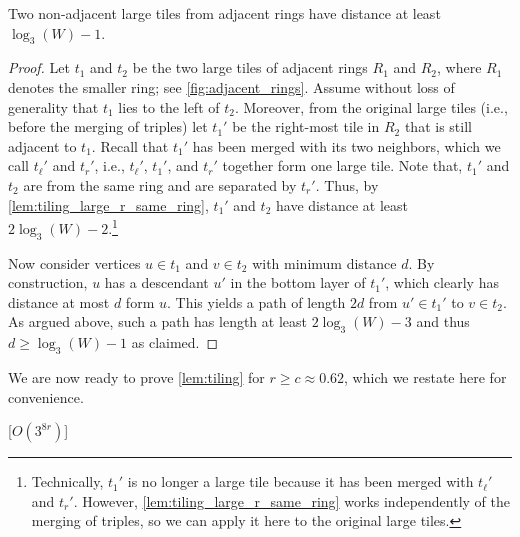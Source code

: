 \documentclass[a4paper,english,cleveref,thm-restate]{lipics-v2021}
\begin{document}
\begin{lemma}
    \label{lem:tiling_large_r_adj_rings}
    Two non-adjacent large tiles from adjacent rings have distance at least $\log_3(W) - 1$.
\end{lemma}
\begin{proof}
    Let $t_1$ and $t_2$ be the two large tiles of adjacent rings $R_1$ and $R_2$, where $R_1$ denotes the smaller ring; see \cref{fig:adjacent_rings}.
    Assume without loss of generality that $t_1$ lies to the left of $t_2$.
    Moreover, from the original large tiles (i.e., before the merging of triples) let $t_1'$ be the right-most tile in $R_2$ that is still adjacent to $t_1$.
    Recall that $t_1'$ has been merged with its two neighbors, which we call $t_\ell'$ and $t_r'$, i.e., $t_\ell'$, $t_1'$, and $t_r'$ together form one large tile.
    Note that, $t_1'$ and $t_2$ are from the same ring and are separated by $t_r'$.
    Thus, by \cref{lem:tiling_large_r_same_ring}, $t_1'$ and $t_2$ have distance at least $2\log_3(W) - 2$.\footnote{Technically, $t_1'$ is no longer a large tile because it has been merged with $t_\ell'$ and $t_r'$.
      However, \cref{lem:tiling_large_r_same_ring} works independently of the merging of triples, so we can apply it here to the original large tiles.}

    Now consider vertices $u \in t_1$ and $v \in t_2$ with minimum distance $d$.
    By construction, $u$ has a descendant $u'$ in the bottom layer of $t_1'$, which clearly has distance at most $d$ form $u$.
    This yields a path of length $2d$ from $u' \in t_1'$ to $v \in t_2$.
    As argued above, such a path has length at least $2\log_3(W) -3$ and thus $d \ge \log_3(W) - 1$ as claimed.
\end{proof}
%
We are now ready to prove \cref{lem:tiling} for $ r \geq c \approx 0.62 $, which we restate here for convenience.

\begin{samepage}
\begin{lemma}\label{lem:tiling_large_radius}
    [$ O(3^{8r}) $]
\end{lemma}
\end{samepage}
\end{document}
